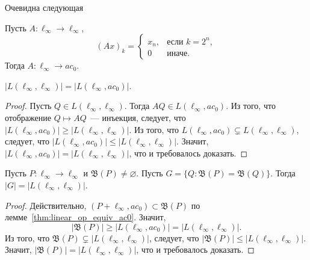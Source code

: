 Очевидна следующая
\begin{lemma}
	Пусть $A:\ell_\infty\to\ell_\infty$,
	\begin{equation}
		(Ax)_k=\begin{cases}
			x_n, & \mbox{если~} k=2^n,
			\\
			0    & \mbox{иначе.}
		\end{cases}
	\end{equation}
	Тогда $A:\ell_\infty\to ac_0$.
\end{lemma}

\begin{corollary}
	$|L(\ell_\infty,\ell_\infty)|=|L(\ell_\infty,ac_0)|$.
\end{corollary}

\begin{proof}
	Пусть $Q\in L(\ell_\infty,\ell_\infty)$.
	Тогда $AQ\in L(\ell_\infty,ac_0)$.
	Из того, что отображение $Q\mapsto AQ$~--- инъекция,
	следует, что $|L(\ell_\infty,ac_0)|\geq|L(\ell_\infty,\ell_\infty)|$.
	Из того, что $ L(\ell_\infty,ac_0) \subsetneq L(\ell_\infty,\ell_\infty)$,
	следует, что $|L(\ell_\infty,ac_0)|\leq|L(\ell_\infty,\ell_\infty)|$.
	Значит, $|L(\ell_\infty,ac_0)|=|L(\ell_\infty,\ell_\infty)|$,
	что и требовалось доказать.
\end{proof}

\begin{corollary}
	Пусть $P:\ell_\infty \to \ell_\infty$ и $\mathfrak{B}(P)\neq\varnothing$.
	Пусть $G = \{Q: \mathfrak{B}(P)= \mathfrak{B}(Q)\}$.
	Тогда $|G| = |L(\ell_\infty,\ell_\infty)|$.
\end{corollary}

\begin{proof}
	Действительно,
	$(P+\ell_\infty,ac_0) \subset \mathfrak{B}(P)$ по лемме~\ref{thm:linear_op_equiv_ac0}.
	Значит,
	\begin{equation}
		|\mathfrak{B}(P)| \geq |L(\ell_\infty,ac_0)|=|L(\ell_\infty,\ell_\infty)|
		.
	\end{equation}
	Из того, что $\mathfrak{B}(P)\subsetneq|L(\ell_\infty,\ell_\infty)|$,
	следует, что $|\mathfrak{B}(P)|\leq|L(\ell_\infty,\ell_\infty)|$.
	Значит, $|\mathfrak{B}(P)|=|L(\ell_\infty,\ell_\infty)|$,
	что и требовалось доказать.
\end{proof}



